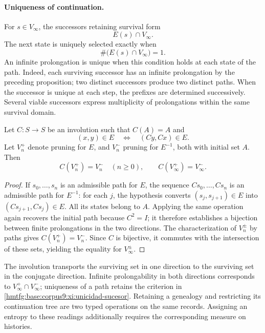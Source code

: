 \paragraph{Uniqueness of continuation.}
For \(s\in V_\infty\), the successors retaining survival form
\[
 E(s)\cap V_\infty.
\]
The next state is uniquely selected exactly when
\begin{equation}
 \#\bigl(E(s)\cap V_\infty\bigr)=1.
 \label{hmtfg:base:corpus9:xi:unicidad-sucesor}
\end{equation}
An infinite prolongation is unique when this condition holds at
each state of the path. Indeed, each surviving successor has an
infinite prolongation by the preceding proposition; two distinct
successors produce two distinct paths. When the successor is unique
at each step, the prefixes are determined successively.
Several viable successors express multiplicity of prolongations
within the same survival domain.

\begin{proposition}
\label{hmtfg:base:corpus9:xi:conjugacion-supervivencia}
Let \(C:S\to S\) be an involution such that \(C(A)=A\) and
\begin{equation}
 (x,y)\in E\quad\Longleftrightarrow\quad(Cy,Cx)\in E.
 \label{hmtfg:base:corpus9:xi:involucion-prolongaciones}
\end{equation}
Let \(V_n^+\) denote pruning for \(E\), and \(V_n^-\) pruning for
\(E^{-1}\), both with initial set \(A\). Then
\[
 C(V_n^+)=V_n^-\quad(n\geq0),\qquad
 C(V_\infty^+)=V_\infty^-.
\]
\end{proposition}

\begin{proof}
If \(s_0,\ldots,s_n\) is an admissible path for \(E\), the sequence
\(Cs_0,\ldots,Cs_n\) is an admissible path for \(E^{-1}\):
for each \(j\), the hypothesis converts
\((s_j,s_{j+1})\in E\) into \((Cs_{j+1},Cs_j)\in E\).
All its states belong to \(A\). Applying the same operation again
recovers the initial path because \(C^2=I\); it therefore establishes
a bijection between finite prolongations in the two directions.
The characterization of \(V_n^\pm\) by paths gives
\(C(V_n^+)=V_n^-\). Since \(C\) is bijective, it commutes with the
intersection of these sets, yielding the equality for
\(V_\infty^\pm\).
\end{proof}

The involution transports the surviving set in one direction to
the surviving set in the conjugate direction. Infinite
prolongability in both directions corresponds to
\(V_\infty^+\cap V_\infty^-\); uniqueness of a path retains the
criterion in \eqref{hmtfg:base:corpus9:xi:unicidad-sucesor}. Retaining a
genealogy and restricting its continuation tree are two typed
operations on the same records. Assigning an entropy to these
readings additionally requires the corresponding measure on histories.
